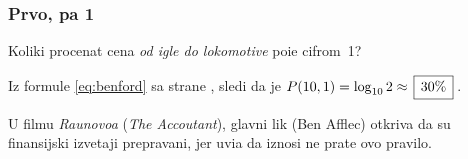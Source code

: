 \subsubsection{Prvo, pa 1}\label{sssec:benford}

\zadatak  
Koliki procenat cena {\sl od igle do lokomotive\/} po{\cv}i{\nj}e cifrom~1?

\resenje 
Iz formule \eqref{eq:benford} sa strane \pageref{eq:benford}, sledi da je 
$P(10,1)=\logten 2 \approx \ram{30\%}$.

\dodatak 
U filmu {\sl Ra{\cv}unovo{\dj}a\/} ({\sl The Accoutant\/}), glavni lik (Ben Afflec) otkriva
da su finansijski izve{\sv}taji preprav{\lj}ani, jer uvi{\dj}a da iznosi
ne prate ovo pravilo.
